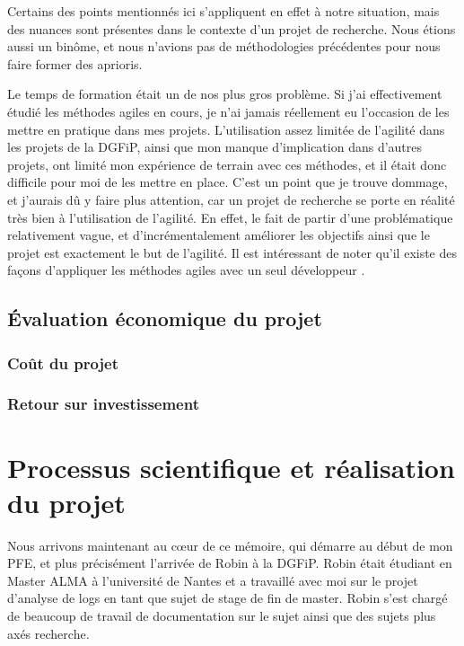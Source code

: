\documentclass[openany, 11pt]{memoir}
\begin{document}
\bigskip
Certains des points mentionnés ici s'appliquent en effet à notre situation, mais des nuances sont présentes dans le contexte d'un projet de recherche. Nous étions aussi un binôme, et nous n'avions pas de méthodologies précédentes pour nous faire former des aprioris.

Le temps de formation était un de nos plus gros problème. Si j'ai effectivement étudié les méthodes agiles en cours, je n'ai jamais réellement eu l'occasion de les mettre en pratique dans mes projets. L'utilisation assez limitée de l'agilité dans les projets de la \gls{DGFiP}, ainsi que mon manque d'implication dans d'autres projets, ont limité mon expérience de terrain avec ces méthodes, et il était donc difficile pour moi de les mettre en place. C'est un point que je trouve dommage, et j'aurais dû y faire plus attention, car un projet de recherche se porte en réalité très bien à l'utilisation de l'agilité. En effet, le fait de partir d'une problématique relativement vague, et d'incrémentalement améliorer les objectifs ainsi que le projet est exactement le but de l'agilité. Il est intéressant de noter qu'il existe des façons d'appliquer les méthodes agiles avec un seul développeur \cite{agilesolo} \cite{ssdm}.

\newpage
\section{Évaluation économique du projet}


\subsection{Coût du projet}

\subsection{Retour sur investissement}

\newpage
\chapter{Processus scientifique et réalisation du projet}

Nous arrivons maintenant au cœur de ce mémoire, qui démarre au début de mon PFE, et plus précisément l'arrivée de Robin à la \gls{DGFiP}. Robin était étudiant en Master ALMA à l'université de Nantes et a travaillé avec moi sur le projet d'analyse de \glspl{log} en tant que sujet de stage de fin de master. Robin s'est chargé de beaucoup de travail de documentation sur le sujet ainsi que des sujets plus axés recherche.
\end{document}

